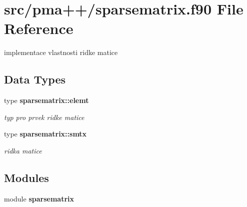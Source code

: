 \section{src/pma++/sparsematrix.f90 File Reference}
\label{sparsematrix_8f90}


implementace vlastnosti ridke matice  


\subsection*{Data Types}
\begin{DoxyCompactItemize}
\item 
type {\bf sparsematrix\+::elemt}
\begin{DoxyCompactList}\small\item\em typ pro prvek ridke matice \end{DoxyCompactList}\item 
type {\bf sparsematrix\+::smtx}
\begin{DoxyCompactList}\small\item\em ridka matice \end{DoxyCompactList}\end{DoxyCompactItemize}
\subsection*{Modules}
\begin{DoxyCompactItemize}
\item 
module {\bf sparsematrix}
\end{DoxyCompactItemize}

